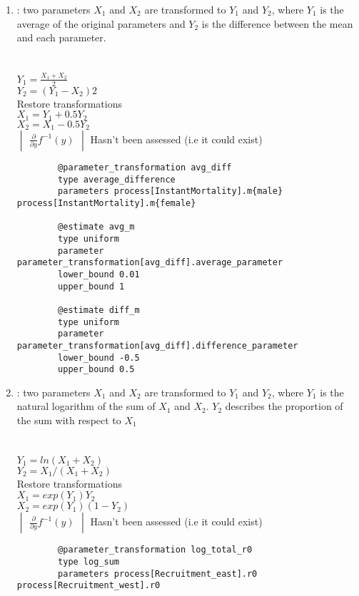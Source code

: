 \begin{enumerate}
\item {} : two parameters $X_1$ and $X_2$ are transformed to $Y_1$ and $Y_2$, where $Y_1$ is the average of the original parameters and $Y_2$ is the difference between the mean and each parameter.\\
\\
\\
$Y_1 = \frac{X_1 + X_2}{2}$\\
$Y_2 =  (Y_1 - X_2)2 $\\
Restore transformations\\
$X_1 = Y_1 + 0.5Y_2$\\
$X_2 = X_1 - 0.5Y_2$\\
$\begin{vmatrix} \frac{\partial}{\partial y} f^{-1}(y) \end{vmatrix}$ Hasn't been assessed (i.e it could exist) \\
\label{sec:Transformation-AverageDifference}
{\small{\begin{verbatim}
		@parameter_transformation avg_diff
		type average_difference
		parameters process[InstantMortality].m{male} process[InstantMortality].m{female}
		
		@estimate avg_m
		type uniform
		parameter parameter_transformation[avg_diff].average_parameter
		lower_bound 0.01
		upper_bound 1
		
		@estimate diff_m
		type uniform
		parameter parameter_transformation[avg_diff].difference_parameter
		lower_bound -0.5
		upper_bound 0.5		
\end{verbatim}}}
	
\item {} : two parameters $X_1$ and $X_2$ are transformed to $Y_1$ and $Y_2$, where $Y_1$ is the natural logarithm of the sum of $X_1$ and $X_2$. $Y_2$ describes the proportion of the sum with respect to $X_1$\\
\\
\\
$Y_1 = ln(X_1 + X_2)$\\
$Y_2 = X_1 / (X_1 + X_2)$\\
Restore transformations\\
$X_1 = exp(Y_1)Y_2$\\
$X_2 =exp(Y_1)(1 - Y_2)$\\
$\begin{vmatrix} \frac{\partial}{\partial y} f^{-1}(y) \end{vmatrix}$ Hasn't been assessed (i.e it could exist) \\
\label{sec:Transformation-LogSum}
{\small{\begin{verbatim}
		@parameter_transformation log_total_r0
		type log_sum
		parameters process[Recruitment_east].r0 process[Recruitment_west].r0
		

\end{verbatim}}}
\end{enumerate}
